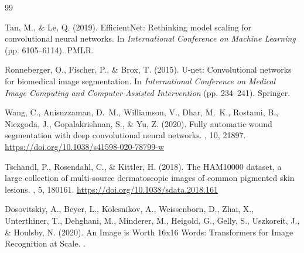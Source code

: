 \documentclass{article}
\begin{document}
\begin{thebibliography}{99}

Tan, M., \& Le, Q. (2019).
\newblock EfficientNet: Rethinking model scaling for convolutional neural networks.
\newblock In {\em International Conference on Machine Learning} (pp. 6105--6114).
\newblock PMLR.

Ronneberger, O., Fischer, P., \& Brox, T. (2015).
\newblock U-net: Convolutional networks for biomedical image segmentation.
\newblock In {\em International Conference on Medical Image Computing and Computer-Assisted Intervention} (pp. 234--241).
\newblock Springer.

Wang, C., Anisuzzaman, D.~M., Williamson, V., Dhar, M.~K., Rostami, B., Niezgoda, J., Gopalakrishnan, S., \& Yu, Z. (2020).
\newblock Fully automatic wound segmentation with deep convolutional neural networks.
, 10, 21897.
\newblock \url{https://doi.org/10.1038/s41598-020-78799-w}

Tschandl, P., Rosendahl, C., \& Kittler, H. (2018).
\newblock The HAM10000 dataset, a large collection of multi-source dermatoscopic images of common pigmented skin lesions.
, 5, 180161.
\newblock \url{https://doi.org/10.1038/sdata.2018.161}

Dosovitskiy, A., Beyer, L., Kolesnikov, A., Weissenborn, D., Zhai, X., Unterthiner, T., Dehghani, M., Minderer, M., Heigold, G., Gelly, S., Uszkoreit, J., \& Houlsby, N. (2020).
\newblock An Image is Worth 16x16 Words: Transformers for Image Recognition at Scale.
.

\end{thebibliography}
\end{document}
